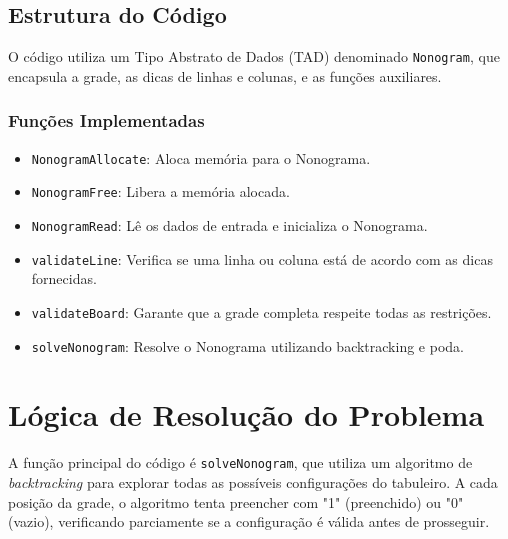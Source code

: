 \documentclass[a4paper,12pt]{article}
\begin{document}
\subsection{Estrutura do C\'odigo}
O c\'odigo utiliza um Tipo Abstrato de Dados (TAD) denominado \texttt{Nonogram}, que encapsula a grade, as dicas de linhas e colunas, e as fun\c{c}\~oes auxiliares.

\subsubsection{Fun\c{c}\~oes Implementadas}
\begin{itemize}
    \item \texttt{NonogramAllocate}: Aloca mem\'oria para o Nonograma.
    \item \texttt{NonogramFree}: Libera a mem\'oria alocada.
    \item \texttt{NonogramRead}: L\^e os dados de entrada e inicializa o Nonograma.
    \item \texttt{validateLine}: Verifica se uma linha ou coluna est\'a de acordo com as dicas fornecidas.
    \item \texttt{validateBoard}: Garante que a grade completa respeite todas as restri\c{c}\~oes.
    \item \texttt{solveNonogram}: Resolve o Nonograma utilizando backtracking e poda.
\end{itemize}

\section{L\'ogica de Resolu\c{c}\~ao do Problema}
A fun\c{c}\~ao principal do c\'odigo \'e \texttt{solveNonogram}, que utiliza um algoritmo de \textit{backtracking} para explorar todas as poss\'iveis configura\c{c}\~oes do tabuleiro. A cada posi\c{c}\~ao da grade, o algoritmo tenta preencher com "1" (preenchido) ou "0" (vazio), verificando parciamente se a configura\c{c}\~ao \'e v\'alida antes de prosseguir.
\end{document}
